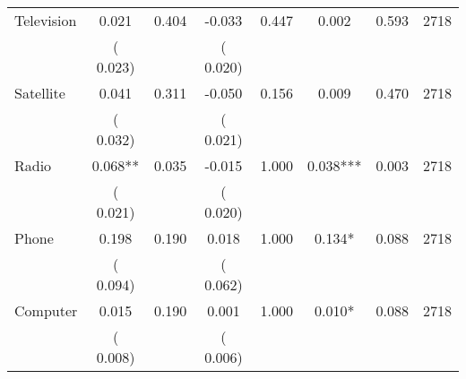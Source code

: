 \begin{tabular}{l*{7}{c}}
 Television       &              0.021       &        0.404  &             -0.033       &        0.447  &              0.002       &              0.593 &  2718 \\ 
                       &       (       0.023)             &                               &       (       0.020)                     &                               &                                               &                                &                      \\ 

 Satellite       &              0.041       &        0.311  &             -0.050       &        0.156  &              0.009       &              0.470 &  2718 \\ 
                       &       (       0.032)             &                               &       (       0.021)                     &                               &                                               &                                &                      \\ 

 Radio       &              0.068**       &        0.035  &             -0.015       &        1.000  &              0.038***       &              0.003 &  2718 \\ 
                       &       (       0.021)             &                               &       (       0.020)                     &                               &                                               &                                &                      \\ 

 Phone       &              0.198       &        0.190  &              0.018       &        1.000  &              0.134*       &              0.088 &  2718 \\ 
                       &       (       0.094)             &                               &       (       0.062)                     &                               &                                               &                                &                      \\ 

 Computer       &              0.015       &        0.190  &              0.001       &        1.000  &              0.010*       &              0.088 &  2718 \\ 
                       &       (       0.008)             &                               &       (       0.006)                     &                               &                                               &                                &                      \\ 


\end{tabular}
